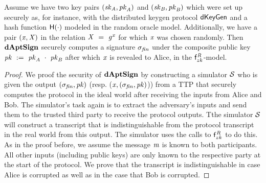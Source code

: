 \begin{theorem} \label{lem:sig:daptsign}
    Assume we have two key pairs $(\mathit{sk}_{\mathit{A}}, \mathit{pk}_{\mathit{A}})$ and $(\mathit{sk}_{\mathit{B}}, \mathit{pk}_{\mathit{B}})$ which were set up securely as, for instance, with the distributed keygen protocol $\mathsf{dKeyGen}$ and a hash function $\mathsf{H} (\cdot)$ modeled in the random oracle model.
    Additionally, we have a pair $(\mathit{x}, \mathit{X})$ in the relation $\mathit{X} ~=~ \mathit{g}^{\mathit{x}}$ for which $\mathit{x}$ was chosen randomly.
    Then $\mathbf{dAptSign}$ securely computes a signature $\sigma_{\mathit{fin}}$ under the composite public key $\mathit{pk} ~:=~ \mathit{pk}_{\mathit{A}} ~\cdot~ \mathit{pk}_{\mathit{B}}$ after which $\mathit{x}$ is revealed to Alice, in the $\mathsf{f}^{\mathit{R}}_{zk}$-model.
\end{theorem}

\begin{proof}
    We proof the security of $\mathbf{dAptSign}$ by constructing a simulator $\mathcal{S}$ who is given the output $(\sigma_{\mathit{fin}}, \mathit{pk})$ (resp. ($\mathit{x}, (\sigma_{\mathit{fin}}, \mathit{pk})$)) from a TTP that securely computes the protocol in the ideal world after receiving the inputs from Alice and Bob.
    The simulator's task again is to extract the adversary's inputs and send them to the trusted third party to receive the protocol outputs.
    Tthe simulator $\mathcal{S}$ will construct a transcript that is indistinguishable from the protocol transcript in the real world from this output.
    The simulator uses the calls to $\mathsf{f}^{\mathit{R}}_{zk}$ to do this.
    As in the proof before, we assume the message $\mathit{m}$ is known to both participants.
    All other inputs (including public keys) are only known to the respective party at the start of the protocol.
    We prove that the transcript is indistinguishable in case Alice is corrupted as well as in the case that Bob is corrupted.


\end{proof}
